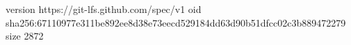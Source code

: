 version https://git-lfs.github.com/spec/v1
oid sha256:67110977e311be892ee8d38e73eecd529184dd63d90b51dfcc02c3b889472279
size 2872
